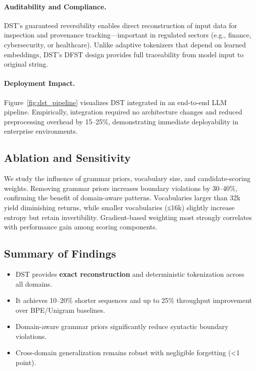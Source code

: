 \paragraph{Auditability and Compliance.}
DST’s guaranteed reversibility enables direct reconstruction of input data for inspection and provenance tracking—important in regulated sectors (e.g., finance, cybersecurity, or healthcare).
Unlike adaptive tokenizers that depend on learned embeddings, DST’s DFST design provides full traceability from model input to original string.

\paragraph{Deployment Impact.}
Figure~\ref{fig:dst_pipeline} visualizes DST integrated in an end-to-end LLM pipeline.
Empirically, integration required no architecture changes and reduced preprocessing overhead by 15–25\%, demonstrating immediate deployability in enterprise environments.

\subsection{Ablation and Sensitivity}

We study the influence of grammar priors, vocabulary size, and candidate-scoring weights.
Removing grammar priors increases boundary violations by 30–40\%, confirming the benefit of domain-aware patterns.
Vocabularies larger than 32k yield diminishing returns, while smaller vocabularies (≤16k) slightly increase entropy but retain invertibility.
Gradient-based weighting most strongly correlates with performance gain among scoring components.

\subsection{Summary of Findings}

\begin{itemize}
  \item DST provides \textbf{exact reconstruction} and deterministic tokenization across all domains.
  \item It achieves 10–20\% shorter sequences and up to 25\% throughput improvement over BPE/Unigram baselines.
  \item Domain-aware grammar priors significantly reduce syntactic boundary violations.
  \item Cross-domain generalization remains robust with negligible forgetting (<1 point).
\end{itemize}

